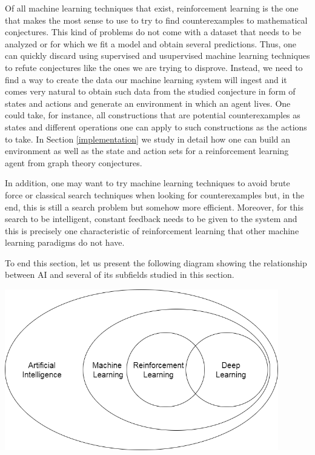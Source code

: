 \documentclass[11pt]{article}
\theoremstyle{definition}
\begin{document}
Of all machine learning techniques that exist, reinforcement learning is the one that makes the most sense to use to try to find counterexamples to mathematical conjectures. This kind of problems do not come with a dataset that needs to be analyzed or for which we fit a model and obtain several predictions. Thus, one can quickly discard using supervised and usupervised machine learning techniques to refute conjectures like the ones we are trying to disprove. Instead, we need to find a way to create the data our machine learning system will ingest and it comes very natural to obtain such data from the studied conjecture in form of states and actions and generate an environment in which an agent lives. One could take, for instance, all constructions that are potential counterexamples as states and different operations one can apply to such constructions as the actions to take. In Section \ref{implementation} we study in detail how one can build an environment as well as the state and action sets for a reinforcement learning agent from graph theory conjectures.

In addition, one may want to try machine learning techniques to avoid brute force or classical search techniques when looking for counterexamples but, in the end, this is still a search problem but somehow more efficient. Moreover, for this search to be intelligent, constant feedback needs to be given to the system and this is precisely one characteristic of reinforcement learning that other machine learning paradigms do not have. 

To end this section, let us present the following diagram showing the relationship between AI and several of its subfields studied in this section. 

\begin{center}
    \centering
    \includegraphics[width=\textwidth, height=7cm, keepaspectratio=true]{images/ai_diagram.jpeg}
    \label{fig:ai_diagram}
\end{center}
\end{document}
